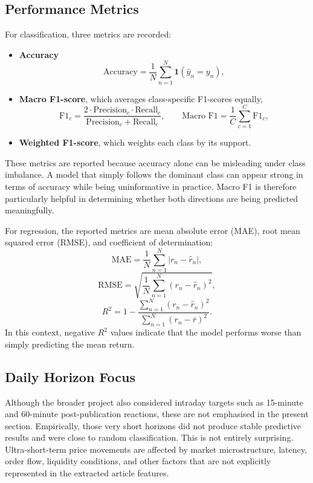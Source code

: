 \subsection{Performance Metrics}

For classification, three metrics are recorded:
\begin{itemize}
    \item \textbf{Accuracy}
    \[
    \text{Accuracy} = \frac{1}{N}\sum_{n=1}^{N}\mathbf{1}(\hat{y}_n = y_n),
    \]
    \item \textbf{Macro F1-score}, which averages class-specific F1-scores equally,
    \[
    \text{F1}_c = \frac{2 \cdot \text{Precision}_c \cdot \text{Recall}_c}{\text{Precision}_c + \text{Recall}_c},
    \qquad
    \text{Macro F1} = \frac{1}{C}\sum_{c=1}^{C}\text{F1}_c,
    \]
    \item \textbf{Weighted F1-score}, which weights each class by its support.
\end{itemize}

These metrics are reported because accuracy alone can be misleading under class imbalance. A model that simply follows the dominant class can appear strong in terms of accuracy while being uninformative in practice. Macro F1 is therefore particularly helpful in determining whether both directions are being predicted meaningfully.

For regression, the reported metrics are mean absolute error (MAE), root mean squared error (RMSE), and coefficient of determination:
\[
\text{MAE} = \frac{1}{N}\sum_{n=1}^{N} |r_n - \hat{r}_n|,
\]
\[
\text{RMSE} = \sqrt{\frac{1}{N}\sum_{n=1}^{N}(r_n - \hat{r}_n)^2},
\]
\[
R^2 = 1 - \frac{\sum_{n=1}^{N}(r_n-\hat{r}_n)^2}{\sum_{n=1}^{N}(r_n-\bar{r})^2}.
\]
In this context, negative $R^2$ values indicate that the model performs worse than simply predicting the mean return.

\subsection{Daily Horizon Focus}

Although the broader project also considered intraday targets such as 15-minute and 60-minute post-publication reactions, these are not emphasised in the present section. Empirically, those very short horizons did not produce stable predictive results and were close to random classification. This is not entirely surprising. Ultra-short-term price movements are affected by market microstructure, latency, order flow, liquidity conditions, and other factors that are not explicitly represented in the extracted article features.


